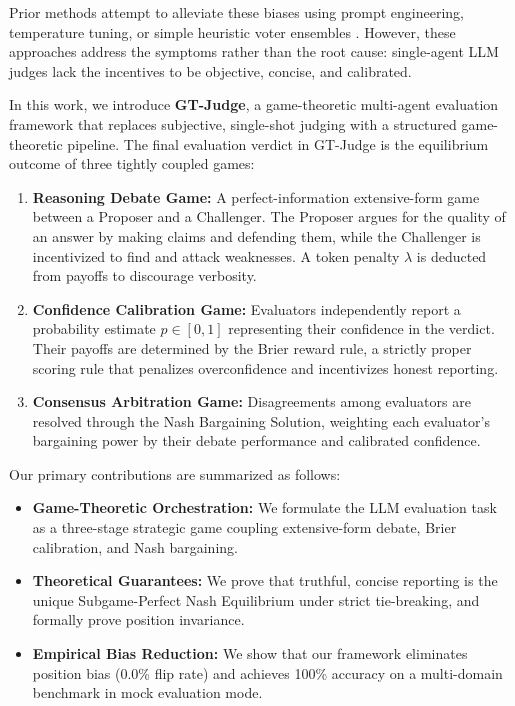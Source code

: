 \documentclass[11pt,a4paper]{article}
\begin{document}
Prior methods attempt to alleviate these biases using prompt engineering, temperature tuning, or simple heuristic voter ensembles \citep{trustjudge2026, confmad2025}. However, these approaches address the symptoms rather than the root cause: single-agent LLM judges lack the incentives to be objective, concise, and calibrated.

In this work, we introduce \textbf{GT-Judge}, a game-theoretic multi-agent evaluation framework that replaces subjective, single-shot judging with a structured game-theoretic pipeline. The final evaluation verdict in GT-Judge is the equilibrium outcome of three tightly coupled games:
\begin{enumerate}
    \item \textbf{Reasoning Debate Game:} A perfect-information extensive-form game between a Proposer and a Challenger. The Proposer argues for the quality of an answer by making claims and defending them, while the Challenger is incentivized to find and attack weaknesses. A token penalty $\lambda$ is deducted from payoffs to discourage verbosity.
    \item \textbf{Confidence Calibration Game:} Evaluators independently report a probability estimate $\hat{p} \in [0, 1]$ representing their confidence in the verdict. Their payoffs are determined by the Brier reward rule, a strictly proper scoring rule that penalizes overconfidence and incentivizes honest reporting.
    \item \textbf{Consensus Arbitration Game:} Disagreements among evaluators are resolved through the Nash Bargaining Solution, weighting each evaluator's bargaining power by their debate performance and calibrated confidence.
\end{enumerate}

Our primary contributions are summarized as follows:
\begin{itemize}
    \item \textbf{Game-Theoretic Orchestration:} We formulate the LLM evaluation task as a three-stage strategic game coupling extensive-form debate, Brier calibration, and Nash bargaining.
    \item \textbf{Theoretical Guarantees:} We prove that truthful, concise reporting is the unique Subgame-Perfect Nash Equilibrium under strict tie-breaking, and formally prove position invariance.
    \item \textbf{Empirical Bias Reduction:} We show that our framework eliminates position bias (0.0\% flip rate) and achieves 100\% accuracy on a multi-domain benchmark in mock evaluation mode.
\end{itemize}
\end{document}
